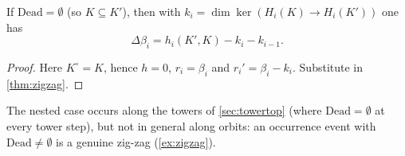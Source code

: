 \begin{theorem}\label{thm:nested}
If $\mathrm{Dead}=\emptyset$ (so $K\subseteq K'$), then with $k_i=\dim\ker(H_i(K)\to H_i(K'))$ one has
\[
\Delta\beta_i=h_i(K',K)-k_i-k_{i-1}.
\]
\end{theorem}
\begin{proof}
Here $K^\circ=K$, hence $h=0$, $r_i=\beta_i$ and $r_i'=\beta_i-k_i$. Substitute in \cref{thm:zigzag}. \qedhere
\end{proof}
\begin{remark}[scope]
The nested case occurs along the towers of \cref{sec:towertop} (where $\mathrm{Dead}=\emptyset$ at every tower step), but not in general along orbits: an occurrence event with $\mathrm{Dead}\ne\emptyset$ is a genuine zig-zag (\cref{ex:zigzag}).
\end{remark}
